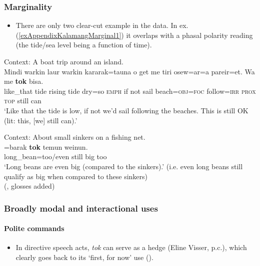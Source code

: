 \subsubsection{Marginality}\label{appendixKalamangMarginal}
\begin{itemize}
	\item There are only two clear-cut example in the data. In ex. (\ref{exAppendixKalamangMarginal1}) it overlaps with a phasal polarity reading (the tide/sea level being a function of time).
\end{itemize}
\largerpage
\begin{exe}
	\ex\label{exAppendixKalamangMarginal1}
	Context: A boat trip around an island.\\
	\gll Mindi warkin laur warkin kararak=tauna o {get me} tiri osew=ar=a pareir=et. Wa me \textbf{tok} bisa.\\
	like\_that tide rising tide dry=so \textsc{emph} {if not} sail beach=\textsc{obj}=\textsc{foc} follow=\textsc{irr} \textsc{prox} \textsc{top} still can\\
	\glt \lq Like that the tide is low, if not we’d sail following the beaches. This is still OK (lit: this, [we] still can).' \parencite{Visser2021b}
	
	\ex\label{exAppendixKalamangMarginal2}
	Context: About small sinkers on a fishing net.\\
	=barak \textbf{tok} temun weinun.\\
	long\_bean=too/even still big too\\
	\glt \lq Long beans are even big (compared to the sinkers).' (i.e. even long beans still qualify as big when compared to these sinkers)
	\\(\cite{Visser2021b}, glosses added)
\end{exe}
	
\subsubsection{Broadly modal and interactional uses}
\paragraph{Polite commands}\label{appendixKalamangPoliteness}
\begin{itemize}
	\item In directive speech acts, \textit{tok} can serve as a hedge (Eline Visser, p.c.), which clearly goes back to its \lq first, for now\rq{ }use ().
\end{itemize}

